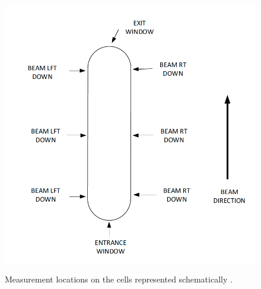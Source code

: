 \documentclass[final,5p,times,twocolumn]{elsarticle}
\begin{document}
\begin{figure}[!h]
  \centering
  \includegraphics[width=\linewidth]{tgt_measurements.png}\\
  \caption{Measurement locations on the cells represented schematically \cite{cellconfig}.}
  \label{fig:cellconfig}
\end{figure}

\end{document}
